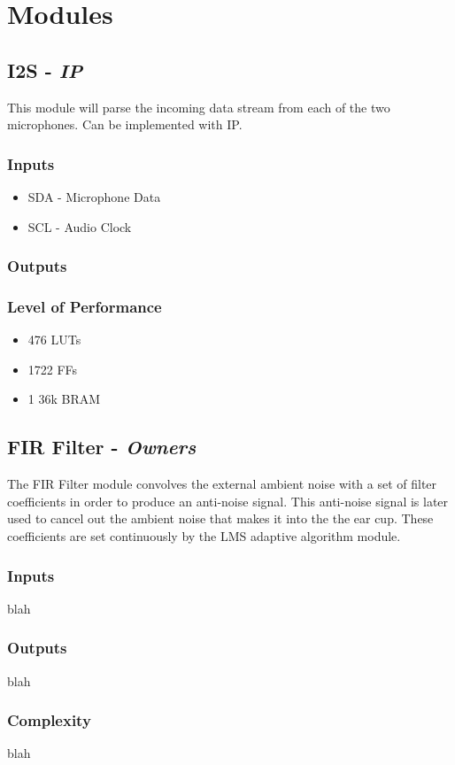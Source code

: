 \documentclass[12pt]{article}
\begin{document}
\section{Modules}
\begin{multicols}{2}
\subsection{I2S - \textit{IP}}
This module will parse the incoming data stream from each of the two microphones. Can be implemented with IP.
\subsubsection{Inputs}
\begin{itemize}
    \item SDA - Microphone Data
    \item SCL - Audio Clock
\end{itemize}
\subsubsection{Outputs}
\subsubsection{Level of Performance}
\begin{itemize}
    \item 476 LUTs
    \item 1722 FFs
    \item 1 36k BRAM
\end{itemize}

\subsection{FIR Filter - \textit{Owners}}
The FIR Filter module convolves the external ambient noise with a set of filter coefficients in order to produce an anti-noise signal. This anti-noise signal is later used to cancel out the ambient noise that makes it into the the ear cup. These coefficients are set continuously by the LMS adaptive algorithm module.
\subsubsection{Inputs}
blah
\subsubsection{Outputs}
blah
\subsubsection{Complexity}
blah

\end{multicols}
\end{document}

